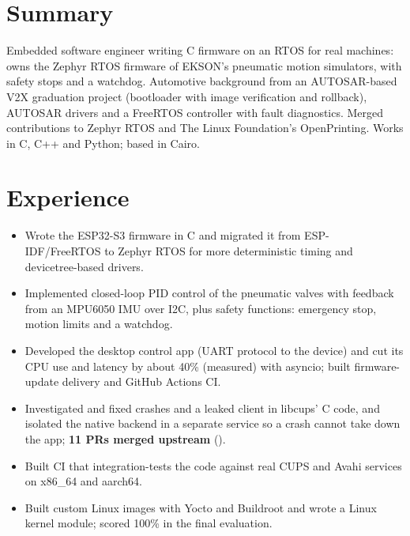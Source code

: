 \documentclass[10pt]{article}
\begin{document}

\section*{Summary}
Embedded software engineer writing C firmware on an RTOS for real machines: owns the Zephyr RTOS firmware of EKSON's pneumatic motion simulators, with safety stops and a watchdog. Automotive background from an AUTOSAR-based V2X graduation project (bootloader with image verification and rollback), AUTOSAR drivers and a FreeRTOS controller with fault diagnostics. Merged contributions to Zephyr RTOS and The Linux Foundation's OpenPrinting. Works in C, C++ and Python; based in Cairo.

\section*{Experience}
\begin{itemize}
  \item Wrote the ESP32-S3 firmware in C and migrated it from ESP-IDF/FreeRTOS to Zephyr RTOS for more deterministic timing and devicetree-based drivers.
  \item Implemented closed-loop PID control of the pneumatic valves with feedback from an MPU6050 IMU over I2C, plus safety functions: emergency stop, motion limits and a watchdog.
  \item Developed the desktop control app (UART protocol to the device) and cut its CPU use and latency by about 40\% (measured) with asyncio; built firmware-update delivery and GitHub Actions CI.
\end{itemize}
\begin{itemize}
  \item Investigated and fixed crashes and a leaked client in libcups' C code, and isolated the native backend in a separate service so a crash cannot take down the app; \textbf{11 PRs merged upstream} ().
  \item Built CI that integration-tests the code against real CUPS and Avahi services on x86\_64 and aarch64.
\end{itemize}
\begin{itemize}
  \item Built custom Linux images with Yocto and Buildroot and wrote a Linux kernel module; scored 100\% in the final evaluation.
\end{itemize}
\end{document}
